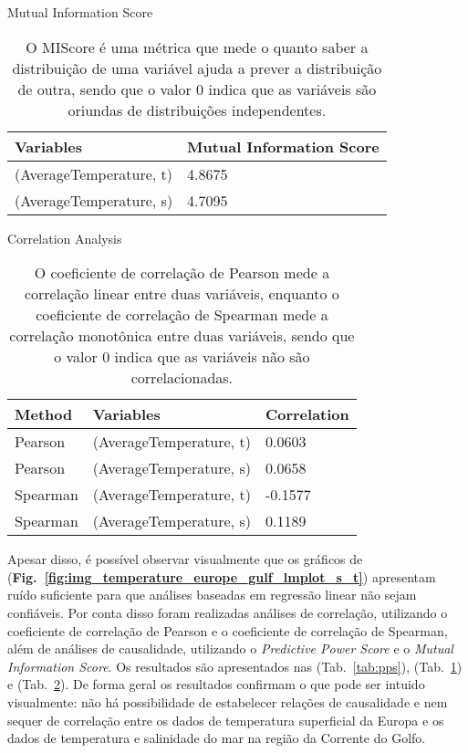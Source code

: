 \documentclass[journal]{IEEEtran}
\newcommand{\figref}[1]{(\textbf{Fig.~\ref{#1}})}
\newcommand{\tabref}[1]{(Tab.~\ref{#1})}
\begin{document}
            \begin{table}[ht]
                \centering
                \caption{Mutual Information Score}
                \begin{tabular}{|l|l|}
                \hline
                Variables & Mutual Information Score \\ \hline
                (AverageTemperature, t) & 4.8675 \\ \hline
                (AverageTemperature, s) & 4.7095 \\ \hline
                \end{tabular}
                \caption*{O MIScore é uma métrica que mede o quanto saber a distribuição de uma variável ajuda a prever a distribuição de outra, sendo que o valor 0 indica que as variáveis são oriundas de distribuições independentes.}
                \label{tab:mi}
            \end{table}
            \begin{table}[ht]
                \centering
                \caption{Correlation Analysis}
                \begin{tabular}{|l|l|l|}
                \hline
                Method & Variables & Correlation \\ \hline
                Pearson & (AverageTemperature, t) & 0.0603 \\ \hline
                Pearson & (AverageTemperature, s) & 0.0658 \\ \hline
                Spearman & (AverageTemperature, t) & -0.1577 \\ \hline
                Spearman & (AverageTemperature, s) & 0.1189 \\ \hline
                \end{tabular}
                \caption*{O coeficiente de correlação de Pearson mede a correlação linear entre duas variáveis, enquanto o coeficiente de correlação de Spearman mede a correlação monotônica entre duas variáveis, sendo que o valor 0 indica que as variáveis não são correlacionadas.}
                \label{tab:correlation}
            \end{table}
            Apesar disso, é possível observar visualmente que os gráficos de \figref{fig:img_temperature_europe_gulf_lmplot_s_t} apresentam ruído suficiente para que análises baseadas em regressão linear não sejam confiáveis. Por conta disso foram realizadas análises de correlação, utilizando o coeficiente de correlação de Pearson e o coeficiente de correlação de Spearman, além de análises de causalidade, utilizando o \textit{Predictive Power Score} e o \textit{Mutual Information Score}. Os resultados são apresentados nas \tabref{tab:pps}, \tabref{tab:mi} e \tabref{tab:correlation}. De forma geral os resultados confirmam o que pode ser intuido visualmente: não há possibilidade de estabelecer relações de causalidade e nem sequer de correlação entre os dados de temperatura superficial da Europa e os dados de temperatura e salinidade do mar na região da Corrente do Golfo.\newline 
\end{document}
